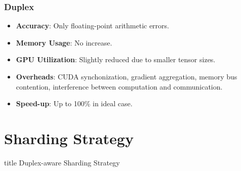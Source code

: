 \documentclass[12pt,aspectratio=169]{beamer}
\begin{document}
    \begin{frame}
        \frametitle{Duplex}

        \begin{itemize}
            \setlength{\itemsep}{.8em}
            \item \textbf{Accuracy}: Only floating-point arithmetic errors.
            \item \textbf{Memory Usage}: No increase.
            \item \textbf{GPU Utilization}: Slightly reduced due to smaller tensor sizes.
            \item \textbf{Overheads}: CUDA synchonization, gradient aggregation, memory bus contention, interference between computation and communication.
            \item \textbf{Speed-up}: Up to 100\% in ideal case.
        \end{itemize}
    \end{frame}


    \section*{Sharding Strategy}

    \begin{frame}
        \centering
        \begin{beamercolorbox}[sep=8pt,center,shadow=true,rounded=true]{title}
          Duplex-aware Sharding Strategy\par%
        \end{beamercolorbox}
    \end{frame}

\end{document}
